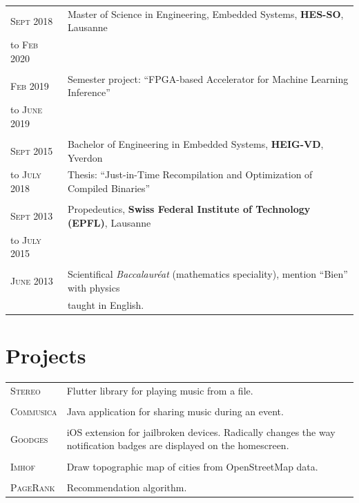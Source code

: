 \documentclass[a4paper,10pt]{article}
\begin{document}
\begin{tabular}{lp{12cm}}
    \textsc{Sept 2018} & Master of Science in Engineering, Embedded Systems, \textbf{HES-SO}, Lausanne \\
    to \textsc{Feb 2020} \\
    \\
    \textsc{Feb 2019} & Semester project: ``FPGA-based Accelerator for Machine Learning Inference'' \\
    to \textsc{June 2019} \\
    \\
    \textsc{Sept 2015} & Bachelor of Engineering in Embedded Systems, \textbf{HEIG-VD}, Yverdon \\
    to \textsc{July 2018} & Thesis: ``Just-in-Time Recompilation and Optimization of Compiled Binaries'' \\
    \\
    \textsc{Sept 2013} & Propedeutics, \textbf{Swiss Federal Institute of Technology (EPFL)}, Lausanne \\
    to \textsc{July 2015} \\
    \\
    \textsc{June 2013} & Scientifical \textit{Baccalauréat} (mathematics speciality), mention ``Bien'' with physics \\
    \hspace*{2.3cm} & taught in English.
\end{tabular}

\section{Projects}

\begin{tabular}{p{2.3cm}p{12cm}}
    \textsc{Stereo}
    & Flutter library for playing music from a file. \\
    \\

    \textsc{Commusica}
    & Java application for sharing music during an event. \\
    \\

    \textsc{Goodges}
    & iOS extension for jailbroken devices. Radically changes the way notification badges are displayed on the homescreen. \\
    \\

    \textsc{Imhof}
    & Draw topographic map of cities from OpenStreetMap data. \\
    \\

    \textsc{PageRank}
    & Recommendation algorithm.
\end{tabular}
\end{document}
